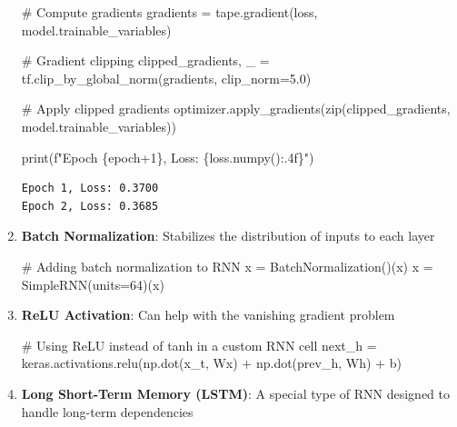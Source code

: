 \documentclass[
  letterpaper,
  DIV=11,
  numbers=noendperiod]{scrreprt}
\newenvironment{Shaded}{\begin{snugshade}}{\end{snugshade}}
\newcommand{\BuiltInTok}[1]{\textcolor[rgb]{0.00,0.23,0.31}{#1}}
\newcommand{\CommentTok}[1]{\textcolor[rgb]{0.37,0.37,0.37}{#1}}
\newcommand{\DecValTok}[1]{\textcolor[rgb]{0.68,0.00,0.00}{#1}}
\newcommand{\FloatTok}[1]{\textcolor[rgb]{0.68,0.00,0.00}{#1}}
\newcommand{\NormalTok}[1]{\textcolor[rgb]{0.00,0.23,0.31}{#1}}
\newcommand{\OperatorTok}[1]{\textcolor[rgb]{0.37,0.37,0.37}{#1}}
\newcommand{\SpecialCharTok}[1]{\textcolor[rgb]{0.37,0.37,0.37}{#1}}
\newcommand{\SpecialStringTok}[1]{\textcolor[rgb]{0.13,0.47,0.30}{#1}}
\begin{document}
\begin{enumerate}
\begin{Shaded}
\begin{Highlighting}[]
         \CommentTok{\# Compute gradients}
\NormalTok{         gradients }\OperatorTok{=}\NormalTok{ tape.gradient(loss, model.trainable\_variables)}

         \CommentTok{\# Gradient clipping}
\NormalTok{         clipped\_gradients, \_ }\OperatorTok{=}\NormalTok{ tf.clip\_by\_global\_norm(gradients, clip\_norm}\OperatorTok{=}\FloatTok{5.0}\NormalTok{)}

         \CommentTok{\# Apply clipped gradients}
\NormalTok{         optimizer.apply\_gradients(}\BuiltInTok{zip}\NormalTok{(clipped\_gradients, model.trainable\_variables))}

     \BuiltInTok{print}\NormalTok{(}\SpecialStringTok{f"Epoch }\SpecialCharTok{\{}\NormalTok{epoch}\OperatorTok{+}\DecValTok{1}\SpecialCharTok{\}}\SpecialStringTok{, Loss: }\SpecialCharTok{\{}\NormalTok{loss}\SpecialCharTok{.}\NormalTok{numpy()}\SpecialCharTok{:.4f\}}\SpecialStringTok{"}\NormalTok{)}
\end{Highlighting}
\end{Shaded}

\begin{verbatim}
Epoch 1, Loss: 0.3700
Epoch 2, Loss: 0.3685
\end{verbatim}
\item
  \textbf{Batch Normalization}: Stabilizes the distribution of inputs to
  each layer

\begin{Shaded}
\begin{Highlighting}[]
\CommentTok{\# Adding batch normalization to RNN}
\NormalTok{x }\OperatorTok{=}\NormalTok{ BatchNormalization()(x)}
\NormalTok{x }\OperatorTok{=}\NormalTok{ SimpleRNN(units}\OperatorTok{=}\DecValTok{64}\NormalTok{)(x)}
\end{Highlighting}
\end{Shaded}
\item
  \textbf{ReLU Activation}: Can help with the vanishing gradient problem

\begin{Shaded}
\begin{Highlighting}[]
\CommentTok{\# Using ReLU instead of tanh in a custom RNN cell}
\NormalTok{next\_h }\OperatorTok{=}\NormalTok{ keras.activations.relu(np.dot(x\_t, Wx) }\OperatorTok{+}\NormalTok{ np.dot(prev\_h, Wh) }\OperatorTok{+}\NormalTok{ b)}
\end{Highlighting}
\end{Shaded}
\item
  \textbf{Long Short-Term Memory (LSTM)}: A special type of RNN designed
  to handle long-term dependencies
\end{enumerate}
\end{document}
